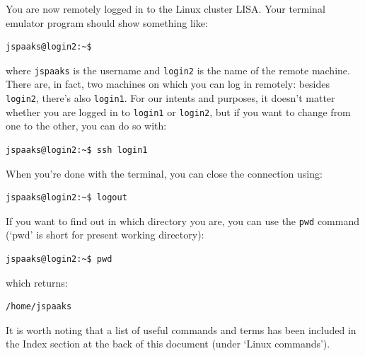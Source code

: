 You are now remotely logged in to the Linux cluster LISA. Your terminal emulator program should show something like:
\begin{lstlisting}[style=basic,style=bash]
jspaaks@login2:~$
\end{lstlisting}
where \texttt{jspaaks} is the username and \texttt{login2} is the name of the remote machine. There are, in fact, two machines on which you can log in remotely: besides \lstinline[style=bashinline]{login2}, there's also \lstinline[style=bashinline]{login1}. For our intents and purposes, it doesn't matter whether you are logged in to \lstinline[style=bashinline]{login1} or \lstinline[style=bashinline]{login2}, but if you want to change from one to the other, you can do so with:
\begin{lstlisting}[style=basic,style=bash]
jspaaks@login2:~$ ssh login1
\end{lstlisting}

When you're done with the terminal, you can close the connection using:
\begin{lstlisting}[style=basic,style=bash]
jspaaks@login2:~$ logout
\end{lstlisting}


If you want to find out in which directory you are, you can use the \lstinline[style=bashinline]{pwd} command (`pwd' is short for present working directory):
\begin{lstlisting}[style=basic,style=bash]
jspaaks@login2:~$ pwd
\end{lstlisting}
which returns:
\begin{lstlisting}[style=basic,style=bash]
/home/jspaaks
\end{lstlisting}
It is worth noting that a list of useful commands and terms has been included in the Index section at the back of this document (under `Linux commands').

